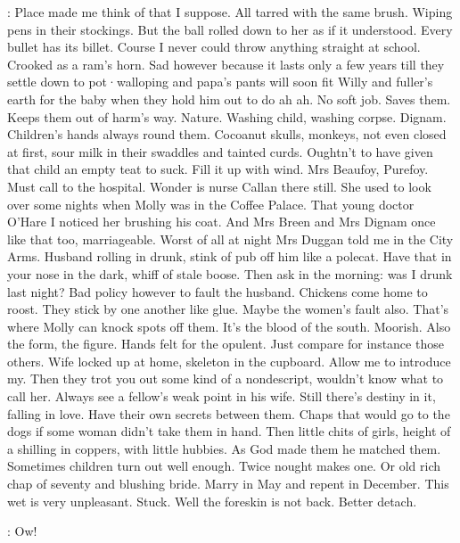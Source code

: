 \Bloom:
Place made me think of that I suppose.
All tarred with the same brush.
Wiping pens in their stockings.
But the ball rolled down to her
as if it understood.
Every bullet has its billet.
Course I never could throw
anything straight at school.
Crooked as a ram's horn.
Sad however because
it lasts only a few years till they settle down to pot·walloping and papa's
pants will soon fit Willy and fuller's earth for the baby when they hold
him out to do ah ah.
No soft job.
Saves them.
Keeps them out of harm's
way.
Nature.
Washing child,
washing corpse.
Dignam.
Children's hands
always round them.
Cocoanut skulls,
monkeys,
not even closed at first,
sour milk in their swaddles and tainted curds.
Oughtn't to have given
that child an empty teat to suck.
Fill it up with wind.
Mrs Beaufoy,
Purefoy.
Must call to the hospital.
Wonder
is nurse Callan there still.
She used to look over some nights when Molly was in the Coffee Palace.
That young doctor O'Hare I noticed her brushing his coat.
And Mrs Breen
and Mrs Dignam once like that too,
marriageable.
Worst of all at night
Mrs Duggan told me in the City Arms.
Husband rolling in drunk,
stink of
pub off him like a polecat.
Have that in your nose in the dark,
whiff of stale boose.
Then ask in the morning:
was I drunk last
night?
Bad policy however to fault the husband.
Chickens come
home to roost.
They stick by one another like glue.
Maybe the
women's fault also.
That's where Molly can knock spots off them.
It's the
blood of the south.
Moorish.
Also the form,
the figure.
Hands felt for the
opulent.
Just compare
for instance
those others.
Wife locked up at home,
skeleton in the cupboard.
Allow me to introduce my.
Then they trot you out
some kind of a nondescript,
wouldn't know what to call her.
Always see a
fellow's weak point in his wife.
Still there's destiny in it,
falling in
love.
Have their own secrets between them.
Chaps that would go to the dogs
if some woman didn't take them in hand.
Then little chits of girls,
height of a shilling in coppers,
with little hubbies.
As God made them he
matched them.
Sometimes children turn out well enough.
Twice nought makes
one.
Or old rich chap of seventy and blushing bride.
Marry in May and
repent in December.
This wet is very unpleasant.
Stuck.
Well the foreskin
is not back.
Better detach.%

\Bloom:
Ow!

